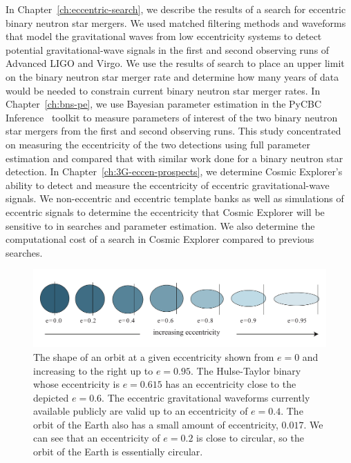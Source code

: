 In Chapter~\ref{ch:eccentric-search}, we describe the results of a search for eccentric binary neutron star mergers. We used matched filtering methods and waveforms that model the gravitational waves from low eccentricity systems to detect potential gravitational-wave signals in the first and second observing runs of Advanced LIGO and Virgo. We use the results of search to place an upper limit on the binary neutron star merger rate and determine how many years of data would be needed to constrain current binary neutron star merger rates. In Chapter~\ref{ch:bns-pe}, we use Bayesian parameter estimation in the PyCBC Inference~\cite{Biwer:2018osg} toolkit to measure parameters of interest of the two binary neutron star mergers from the first and second observing runs. This study concentrated on measuring the eccentricity of the two detections using full parameter estimation and compared that with similar work done for a binary neutron star detection. In Chapter~\ref{ch:3G-eccen-prospects}, we determine Cosmic Explorer's ability to detect and measure the eccentricity of eccentric gravitational-wave signals. We non-eccentric and eccentric template banks as well as simulations of eccentric signals to determine the eccentricity that Cosmic Explorer will be sensitive to in searches and parameter estimation. We also determine the computational cost of a search in Cosmic Explorer compared to previous searches.

\begin{figure}[p]
  \centering
  \includegraphics[width=\textwidth]{Figures/Introduction/eccentricity.pdf}
\caption{The shape of an orbit at a given eccentricity shown from $e=0$ and increasing to the right up to $e=0.95$. The Hulse-Taylor binary whose eccentricity is $e=0.615$ has an eccentricity close to the depicted $e=0.6$. The eccentric gravitational waveforms currently available publicly are valid up to an eccentricity of $e=0.4$. The orbit of the Earth also has a small amount of eccentricity, $0.017$. We can see that an eccentricity of $e=0.2$ is close to circular, so the orbit of the Earth is essentially circular. \vspace{40pt} }
    \label{fig:eccentricity}
\end{figure}

